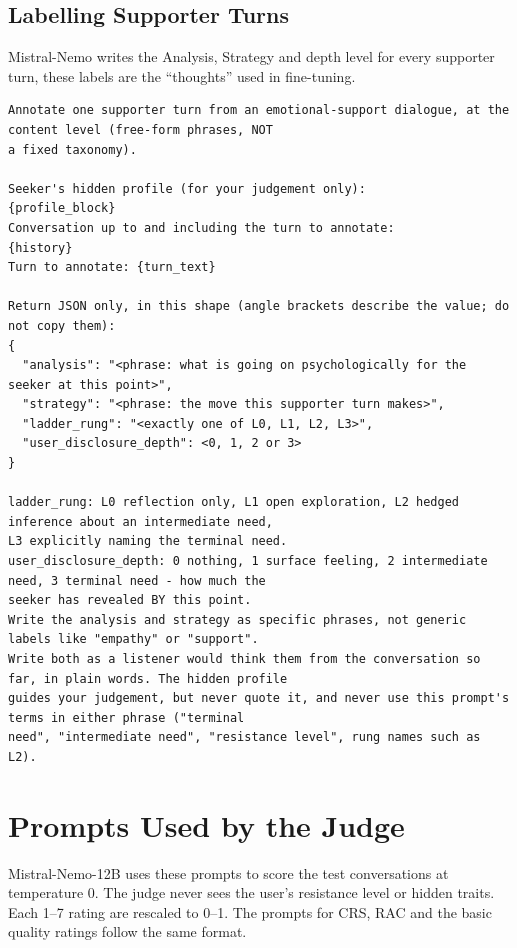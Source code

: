 \documentclass[journal]{IEEEtran}
\begin{document}
\subsection{Labelling Supporter Turns}
Mistral-Nemo writes the Analysis, Strategy and depth level for every supporter turn, these labels are the ``thoughts'' used in fine-tuning.
\begin{lstlisting}
Annotate one supporter turn from an emotional-support dialogue, at the content level (free-form phrases, NOT
a fixed taxonomy).

Seeker's hidden profile (for your judgement only):
{profile_block}
Conversation up to and including the turn to annotate:
{history}
Turn to annotate: {turn_text}

Return JSON only, in this shape (angle brackets describe the value; do not copy them):
{
  "analysis": "<phrase: what is going on psychologically for the seeker at this point>",
  "strategy": "<phrase: the move this supporter turn makes>",
  "ladder_rung": "<exactly one of L0, L1, L2, L3>",
  "user_disclosure_depth": <0, 1, 2 or 3>
}

ladder_rung: L0 reflection only, L1 open exploration, L2 hedged inference about an intermediate need,
L3 explicitly naming the terminal need.
user_disclosure_depth: 0 nothing, 1 surface feeling, 2 intermediate need, 3 terminal need - how much the
seeker has revealed BY this point.
Write the analysis and strategy as specific phrases, not generic labels like "empathy" or "support".
Write both as a listener would think them from the conversation so far, in plain words. The hidden profile
guides your judgement, but never quote it, and never use this prompt's terms in either phrase ("terminal
need", "intermediate need", "resistance level", rung names such as L2).
\end{lstlisting}

\section{Prompts Used by the Judge}
Mistral-Nemo-12B uses these prompts to score the test conversations at temperature 0. The judge never sees the user's resistance level or hidden traits. Each 1--7 rating are rescaled to 0--1. The prompts for CRS, RAC and the basic quality ratings follow the same format.
\end{document}
